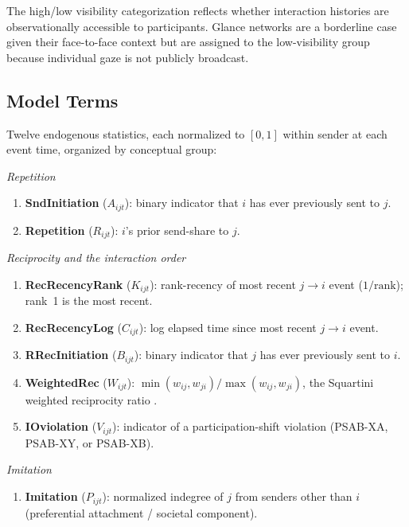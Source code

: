 \documentclass[11pt]{article}
\begin{document}
The high/low visibility categorization reflects whether interaction histories are
observationally accessible to participants. Glance networks are a borderline case
given their face-to-face context but are assigned to the low-visibility group
because individual gaze is not publicly broadcast.

\subsection{Model Terms}

Twelve endogenous statistics, each normalized to $[0,1]$ within sender at each
event time, organized by conceptual group:

\medskip\noindent\textit{Repetition}
\begin{enumerate}[leftmargin=2em]
  \item \textbf{SndInitiation} ($A_{ijt}$): binary indicator that $i$ has
        ever previously sent to $j$.
  \item \textbf{Repetition} ($R_{ijt}$): $i$'s prior send-share to $j$.
\end{enumerate}

\noindent\textit{Reciprocity and the interaction order}
\begin{enumerate}[leftmargin=2em,resume]
  \item \textbf{RecRecencyRank} ($K_{ijt}$): rank-recency of most recent
        $j \to i$ event ($1/\text{rank}$); rank~1 is the most recent.
  \item \textbf{RecRecencyLog} ($C_{ijt}$): log elapsed time since most
        recent $j \to i$ event.
  \item \textbf{RRecInitiation} ($B_{ijt}$): binary indicator that $j$ has
        ever previously sent to $i$.
  \item \textbf{WeightedRec} ($W_{ijt}$): $\min(w_{ij}, w_{ji}) /
        \max(w_{ij}, w_{ji})$, the Squartini weighted reciprocity ratio
        \citep{squartini2013reciprocity}.
  \item \textbf{IOviolation} ($V_{ijt}$): indicator of a participation-shift
        violation (PSAB-XA, PSAB-XY, or PSAB-XB).
\end{enumerate}

\noindent\textit{Imitation}
\begin{enumerate}[leftmargin=2em,resume]
  \item \textbf{Imitation} ($P_{ijt}$): normalized indegree of $j$ from
        senders other than $i$ (preferential attachment / societal component).
\end{enumerate}
\end{document}

